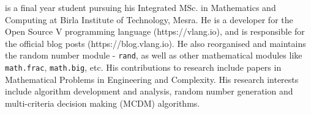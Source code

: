 \documentclass{infor}
\theoremstyle{remark}
\begin{document}
\begin{biography}\label{bio2}
\author{S. Haldar} is a final year student pursuing his Integrated MSc. in Mathematics and Computing at Birla Institute of Technology, Mesra. He is a developer for the Open Source V programming language (https://vlang.io), and is responsible for the official blog posts (https://blog.vlang.io). He also reorganised and maintains the random number module - \texttt{rand}, as well as other mathematical modules like \texttt{math.frac}, \texttt{math.big}, etc. His contributions to research include papers in Mathematical Problems in Engineering and Complexity. His research interests include algorithm development and analysis, random number generation and multi-criteria decision making (MCDM) algorithms.
\end{biography}
\end{document}
